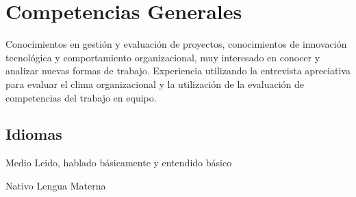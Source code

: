 \section{Competencias Generales}
	{Conocimientos en gesti\'on y evaluaci\'on de proyectos,
	conocimientos de innovaci\'on tecnol\'ogica y comportamiento organizacional,
	muy interesado en conocer y analizar nuevas formas de trabajo. Experiencia utilizando la 
	entrevista apreciativa para evaluar el clima organizacional y la utilizaci\'on de 
	la evaluaci\'on de competencias del trabajo en equipo.}	
\subsection{Idiomas}
	{Medio}
	{Leido, hablado b\'asicamente y entendido b\'asico}
	
	{Nativo}
	{Lengua Materna}

